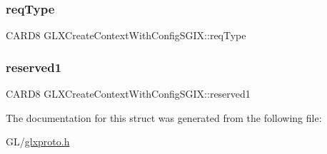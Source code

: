 \subsubsection{\texorpdfstring{req\+Type}{reqType}}
{\footnotesize\ttfamily C\+A\+R\+D8 G\+L\+X\+Create\+Context\+With\+Config\+S\+G\+I\+X\+::req\+Type}

\mbox{\label{struct_g_l_x_create_context_with_config_s_g_i_x_a5755fef4598affef401c3cbdb6cdb61f}} 
\subsubsection{\texorpdfstring{reserved1}{reserved1}}
{\footnotesize\ttfamily C\+A\+R\+D8 G\+L\+X\+Create\+Context\+With\+Config\+S\+G\+I\+X\+::reserved1}



The documentation for this struct was generated from the following file\+:\begin{DoxyCompactItemize}
\item 
G\+L/\hyperlink{glxproto_8h}{glxproto.\+h}\end{DoxyCompactItemize}
